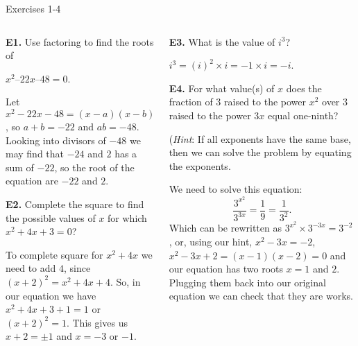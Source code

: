 \documentclass[9pt,aspectratio=169,handout]{beamer}
\begin{document}
\begin{frame}{Exercises 1-4}
  \begin{columns}[T]
    \begin{column}{0.5\textwidth}
      \begin{problem}
        \textbf{E1.} Use factoring to find the roots of 
        
        $x^2 – 22x – 48 = 0$.
      \end{problem}
      Let $x^2 - 22x - 48 = (x - a)(x - b)$, so $a + b = -22$ and $ab = -48$. Looking into divisors of $-48$ we may find that $-24$ and $2$ has a sum of $-22$, so the root of the equation are $\boxed{-22}$ and $\boxed{2}$. 

      \begin{problem}
        \textbf{E2.} Complete the square to find the possible values of $x$ for which $x^2 + 4x + 3 = 0$?
      \end{problem}
      To complete square for $x^2 + 4x$ we need to add $4$, since $(x+2)^2 = x^2 + 4x + 4$. So, in our equation we have $x^2 + 4x + 3 + 1 = 1$ or $(x+2)^2 = 1$. This gives us $x + 2 = \pm 1$ and $x = \boxed{-3}$ or $\boxed{-1}$.

    \end{column}
    \begin{column}{0.5\textwidth}
      \begin{problem}
        \textbf{E3.} What is the value of $i^3$?
      \end{problem}
      $i^3 = (i)^2 \times i = -1 \times i = -i$.
      \begin{problem}
        \textbf{E4.} For what value(s) of $x$ does the fraction of $3$ raised to the power $x^2$ over $3$ raised to the power $3x$ equal one-ninth?  
        
        (\emph{Hint}: If all exponents have the same base, then we can solve the problem by equating the exponents.
      \end{problem}
      We need to solve this equation:
      \[ \frac{3^{x^2}}{3^{3x}} = \frac{1}{9} = \frac{1}{3^2}.\]
      Which can be rewritten as $3^{x^2} \times 3^{-3x} = 3^{-2}$, or, using our hint, $x^2 - 3x = -2$, $x^2 - 3x + 2 = (x - 1)(x - 2) = 0$ and our equation has two roots $x = \boxed{1}$ and $\boxed{2}$. Plugging them back into our original equation we can check that they are works.
    \end{column}
  \end{columns}
\end{frame}
\end{document}
